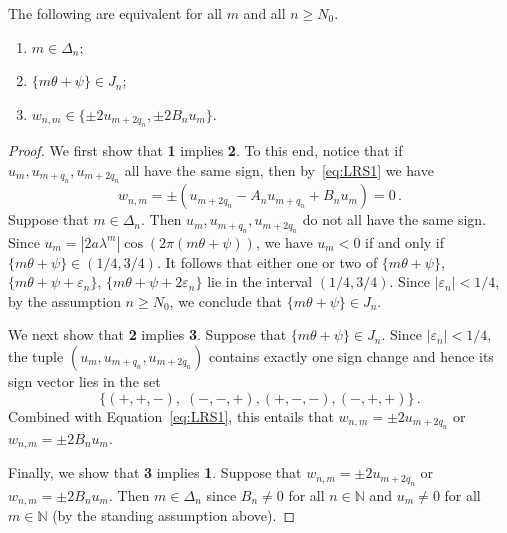 \documentclass[a4paper,UKenglish,cleveref, autoref, thm-restate]{lipics-v2021}
\begin{document}
\begin{proposition}
The following are equivalent for all $m$ and all $n\geq N_0$.
    \begin{enumerate}
        \item $m \in \Delta_n$;
        \item $\{m\theta+\psi\} \in J_n$;
        \item $w_{n,m} \in \{ \pm 2 u_{m+2q_n}, \pm 2B_n u_m \}$.
            \end{enumerate}
    \label{prop:Delta}
\end{proposition}
\begin{proof}
We first show that {\bf 1} implies {\bf 2}.
To this end, notice that if $u_m,u_{m+q_n},u_{m+2q_n}$ all have the same sign, then by~\eqref{eq:LRS1} we have
\[ w_{n,m} = \pm(u_{m+2q_n}-A_nu_{m+q_n}+B_n u_m) = 0 \, .
\]
Suppose that $m\in \Delta_n$.  Then 
$u_{m},u_{m+q_n},u_{m+2q_n}$ do not all have the same sign.
Since $u_m = |2a\lambda^m|\cos(2\pi(m\theta+\psi))$, we have $u_m<0$ 
if and only if $\{ m\theta+\psi \} \in (1/4,3/4)$.  It follows that either one or two of 
$\{m\theta+\psi\}$, $\{m\theta+\psi+\varepsilon_n\}$, $\{m\theta+\psi+2\varepsilon_n\}$ lie in 
the interval $(1/4,3/4)$.
Since $|\varepsilon_n|<1/4$, by the assumption $n\geq N_0$, we conclude 
that $\{m\theta+\psi\} \in J_n$.  

We next show that {\bf 2} implies {\bf 3}.
Suppose that $\{m\theta+\psi\} \in J_n$.  
Since $|\varepsilon_n| < 1/4$, the tuple $(u_m,u_{m+q_n},u_{m+2q_n})$ contains exactly one sign change and hence  its sign vector lies in the set 
 \[ \{ (+,+,-),\;(-,-,+),(+,-,-),(-,+,+) \} \, .\]
 Combined with Equation~\eqref{eq:LRS1}, this entails that $w_{n,m}=\pm 2u_{m+2q_n}$ or $w_{n,m}=\pm 2B_nu_{m}$.

 Finally,  we show that {\bf 3} implies {\bf 1}.
 Suppose that $w_{n,m}=\pm 2u_{m+2q_n}$ or $w_{n,m}=\pm 2B_nu_{m}$.  Then $m\in \Delta_n$ since 
 $B_n\neq 0$ for all $n \in \mathbb N$ and 
 $u_m\neq 0$ for all $m\in \mathbb N$ (by the standing assumption above).
\end{proof}
\end{document}
